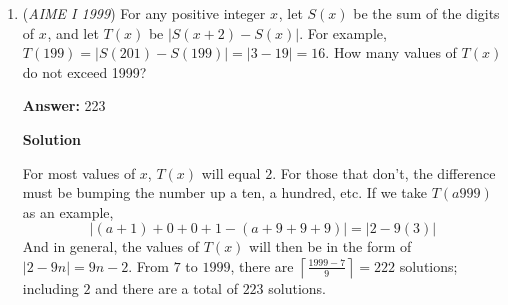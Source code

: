 \begin{enumerate}
 



\textbf{Solution 2}

Define the two possible \href{https://artofproblemsolving.com/wiki/index.php?title=Distance}{distances} from one of the labeled points and the \href{https://artofproblemsolving.com/wiki/index.php?title=Vertex}{corners} of the square upon which the point lies as $x$ and $y$. The area of the \href{https://artofproblemsolving.com/wiki/index.php?title=Octagon}{octagon} (by \href{https://artofproblemsolving.com/wiki/index.php?title=Subtraction}{subtraction} of areas) is $1 - 4\left(\frac{1}{2}xy\right) = 1 - 2xy$. 

 By the \href{https://artofproblemsolving.com/wiki/index.php?title=Pythagorean\_theorem}{Pythagorean theorem},
 \[x^2 + y^2 = \left(\frac{43}{99}\right)^2\]

 Also,
 \begin{align*}x + y + \frac{43}{99} &= 1\\ x^2 + 2xy + y^2 &= \left(\frac{56}{99}\right)^2\end{align*}


 Substituting,
 \begin{align*}\left(\frac{43}{99}\right)^2 + 2xy &= \left(\frac{56}{99}\right)^2 \\ 2xy = \frac{(56 + 43)(56 - 43)}{99^2} &= \frac{13}{99} \end{align*}


 Thus, the area of the octagon is $1 - \frac{13}{99} = \frac{86}{99}$, so $m + n = \boxed{185}$.

 


	\item (\textit{AIME I 1999}) For any positive integer $x_{}$, let $S(x)$ be the sum of the digits of $x_{}$, and let $T(x)$ be $|S(x+2)-S(x)|.$  For example, $T(199)=|S(201)-S(199)|=|3-19|=16.$  How many values of $T(x)$ do not exceed 1999?


 
 \textbf{Answer: }223



\textbf{Solution}

For most values of $x$, $T(x)$ will equal $2$. For those that don't, the difference must be bumping the number up a ten, a hundred, etc. If we take $T(a999)$ as an example,
 \[|(a + 1) + 0 + 0 + 1 - (a + 9 + 9 + 9)| = |2 - 9(3)|\]And in general, the values of $T(x)$ will then be in the form of $|2 - 9n| = 9n - 2$. From $7$ to $1999$, there are $\left\lceil \frac{1999 - 7}{9}\right\rceil = 222$ solutions; including $2$ and there are a total of $\boxed{223}$ solutions.


\end{enumerate}
